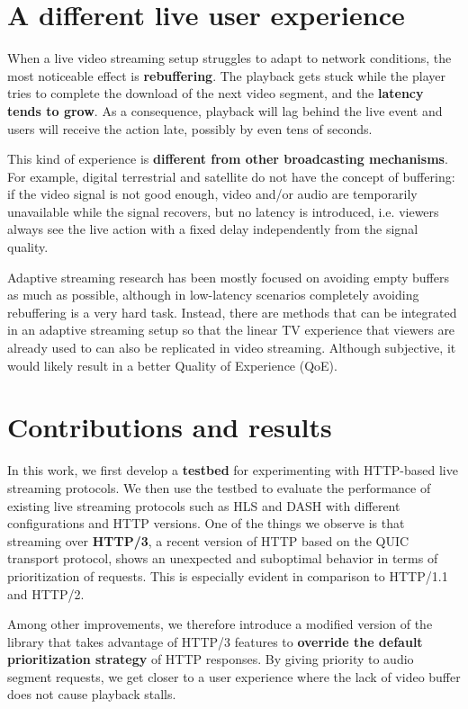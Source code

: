 \section{A different live user experience}
\label{sec:intro/experience}

When a live video streaming setup struggles to adapt to network conditions, the most noticeable effect is \textbf{rebuffering}. The playback gets stuck while the player tries to complete the download of the next video segment, and the \textbf{latency tends to grow}. As a consequence, playback will lag behind the live event and users will receive the action late, possibly by even tens of seconds.

This kind of experience is \textbf{different from other broadcasting mechanisms}. For example, digital terrestrial and satellite do not have the concept of buffering: if the video signal is not good enough, video and/or audio are temporarily unavailable while the signal recovers, but no latency is introduced, i.e. viewers always see the live action with a fixed delay independently from the signal quality.

Adaptive streaming research has been mostly focused on avoiding empty buffers as much as possible, although in low-latency scenarios completely avoiding rebuffering is a very hard task. Instead, there are methods that can be integrated in an adaptive streaming setup so that the linear TV experience that viewers are already used to can also be replicated in video streaming. Although subjective, it would likely result in a better Quality of Experience (QoE).

\section{Contributions and results}
\label{sec:intro/contributions}

In this work, we first develop a \textbf{testbed} for experimenting with HTTP-based live streaming protocols. We then use the testbed to evaluate the performance of existing live streaming protocols such as HLS and DASH with different configurations and HTTP versions. One of the things we observe is that streaming over \textbf{HTTP/3}, a recent version of HTTP based on the QUIC transport protocol, shows an unexpected and suboptimal behavior in terms of prioritization of requests. This is especially evident in comparison to HTTP/1.1 and HTTP/2.

Among other improvements, we therefore introduce a modified version of the \hlsjs{} library that takes advantage of HTTP/3 features to \textbf{override the default prioritization strategy} of HTTP responses. By giving priority to audio segment requests, we get closer to a user experience where the lack of video buffer does not cause playback stalls.


